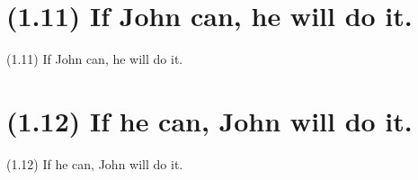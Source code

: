 \documentclass{article}
\begin{document}
\clearpage

%
%

\section*{(1.11) If John can, he will do it.}

\bigbreak
\begin{enumerate*}
\item[(1.11)] If John can, he will do it.
\end{enumerate*}
\bigbreak

\bigbreak
\begin{minipage}{\textwidth}
\end{minipage}
\bigbreak

\clearpage

%
%

\section*{(1.12) If he can, John will do it.}

\bigbreak
\begin{enumerate*}
\item[(1.12)] If he can, John will do it.
\end{enumerate*}
\bigbreak

\bigbreak
\begin{minipage}{\textwidth}
\end{minipage}
\bigbreak
\end{document}
